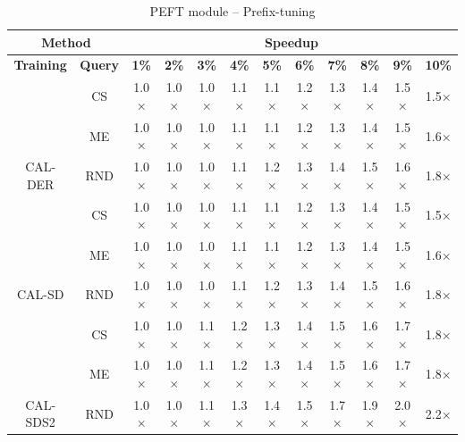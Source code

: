 \begin{table}[htbp]
\begin{subtable}{\linewidth}
\begin{tabular}{c|c|cccccccccc}
\toprule
\multicolumn{2}{c|}{\textbf{Method}} & \multicolumn{10}{c}{\textbf{Speedup}} \\
\midrule
\textbf{Training} & \textbf{Query} & \textbf{1\%} & \textbf{2\%} & \textbf{3\%} & \textbf{4\%} & \textbf{5\%} & \textbf{6\%} & \textbf{7\%} & \textbf{8\%} & \textbf{9\%} & \textbf{10\%}\\
\midrule
 & CS & 1.0$\times$ & 1.0$\times$ & 1.0$\times$ & 1.1$\times$ & 1.1$\times$ & 1.2$\times$ & 1.3$\times$ & 1.4$\times$ & 1.5$\times$ & 1.5$\times$\\

 & ME & 1.0$\times$ & 1.0$\times$ & 1.0$\times$ & 1.1$\times$ & 1.1$\times$ & 1.2$\times$ & 1.3$\times$ & 1.4$\times$ & 1.5$\times$ & 1.6$\times$\\

\multirow{-3}{*}{\raggedright\arraybackslash CAL-DER} & RND & 1.0$\times$ & 1.0$\times$ & 1.0$\times$ & 1.1$\times$ & 1.2$\times$ & 1.3$\times$ & 1.4$\times$ & 1.5$\times$ & 1.6$\times$ & 1.8$\times$\\
\midrule
 & CS & 1.0$\times$ & 1.0$\times$ & 1.0$\times$ & 1.1$\times$ & 1.1$\times$ & 1.2$\times$ & 1.3$\times$ & 1.4$\times$ & 1.5$\times$ & 1.5$\times$\\

 & ME & 1.0$\times$ & 1.0$\times$ & 1.0$\times$ & 1.1$\times$ & 1.1$\times$ & 1.2$\times$ & 1.3$\times$ & 1.4$\times$ & 1.5$\times$ & 1.6$\times$\\

\multirow{-3}{*}{\raggedright\arraybackslash CAL-SD} & RND & 1.0$\times$ & 1.0$\times$ & 1.0$\times$ & 1.1$\times$ & 1.2$\times$ & 1.3$\times$ & 1.4$\times$ & 1.5$\times$ & 1.6$\times$ & 1.8$\times$\\
\midrule
 & CS & 1.0$\times$ & 1.0$\times$ & 1.1$\times$ & 1.2$\times$ & 1.3$\times$ & 1.4$\times$ & 1.5$\times$ & 1.6$\times$ & 1.7$\times$ & 1.8$\times$\\

 & ME & 1.0$\times$ & 1.0$\times$ & 1.1$\times$ & 1.2$\times$ & 1.3$\times$ & 1.4$\times$ & 1.5$\times$ & 1.6$\times$ & 1.7$\times$ & 1.8$\times$\\

\multirow{-3}{*}{\raggedright\arraybackslash CAL-SDS2} & RND & 1.0$\times$ & 1.0$\times$ & 1.1$\times$ & 1.3$\times$ & 1.4$\times$ & 1.5$\times$ & 1.7$\times$ & 1.9$\times$ & 2.0$\times$ & 2.2$\times$\\
\bottomrule
\end{tabular}
\end{subtable}
\vspace{1em}
\begin{subtable}{\linewidth}
\centering
\caption{PEFT module -- Prefix-tuning}


\end{subtable}
\end{table}

